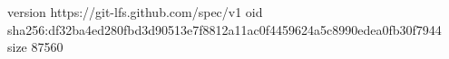 version https://git-lfs.github.com/spec/v1
oid sha256:df32ba4ed280fbd3d90513e7f8812a11ac0f4459624a5c8990edea0fb30f7944
size 87560

